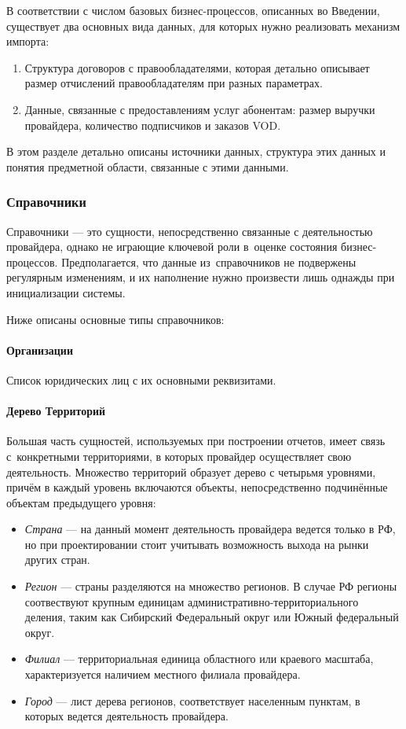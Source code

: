 В соответствии с числом базовых бизнес-процессов, описанных во Введении, существует два
основных вида данных, для которых нужно реализовать механизм импорта:

\begin{enumerate}
\item{
Структура договоров с правообладателями, которая детально описывает размер 
отчислений правообладателям при разных параметрах.
}
\item{
Данные, связанные с предоставлениям услуг абонентам: размер выручки провайдера, количество подписчиков и заказов VOD. 
}
\end{enumerate}

В этом разделе детально описаны источники данных, структура этих данных и понятия предметной области,
связанные с этими данными.

\subsubsection{Справочники}
Справочники --- это сущности, непосредственно связанные с деятельностью провайдера, однако не играющие ключевой роли
в~оценке состояния бизнес-процессов. Предполагается, что данные из~справочников не подвержены регулярным изменениям,
и их наполнение нужно произвести лишь однажды при инициализации системы.

Ниже описаны основные типы справочников:
\paragraph{Организации}
Список юридических лиц с их основными реквизитами. 

\paragraph{Дерево Территорий}
\label{par:regions}
Большая часть сущностей, используемых при построении отчетов, имеет связь с~конкретными территориями,
в которых провайдер осуществляет свою деятельность. Множество территорий образует дерево 
с четырьмя уровнями, причём в каждый уровень включаются объекты, непосредственно подчинённые объектам предыдущего уровня:

\begin{itemize}
\item{
  \textit{Страна} --- на данный момент деятельность провайдера ведется только в РФ, но при проектировании
  стоит учитывать возможность выхода на рынки других стран.
}
\item{
  \textit{Регион} --- страны разделяются на множество регионов. В случае РФ регионы соотвествуют
  крупным единицам административно-территориального деления, таким как Сибирский Федеральный округ 
  или Южный федеральный округ.
}
\item{
  \textit{Филиал} --- территориальная единица областного или краевого масштаба, характеризуется наличием
  местного филиала провайдера.
}
\item{
  \textit{Город} --- лист дерева регионов, соответствует населенным пунктам, в которых ведется деятельность провайдера.
}
\end{itemize}

